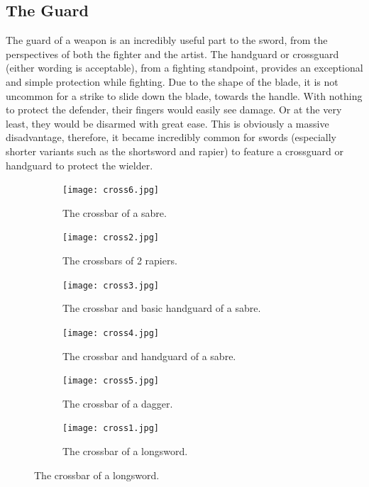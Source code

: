 \documentclass{article}
\begin{document}
\subsection{The Guard}
The guard of a weapon is an incredibly useful part to the sword, from the perspectives of both the fighter and the artist. The handguard or crossguard (either wording is acceptable), from a fighting standpoint, provides an exceptional and simple protection while fighting. Due to the shape of the blade, it is not uncommon for a strike to slide down the blade, towards the handle. With nothing to protect the defender, their fingers would easily see damage. Or at the very least, they would be disarmed with great ease. This is obviously a massive disadvantage, therefore, it became incredibly common for swords (especially shorter variants such as the shortsword and rapier) to feature a crossguard or handguard to protect the wielder.

\begin{figure}[H]
    \centering
    \caption{A collection of crossguards from various blades}
    \label{fig:Crossguards}
    \begin{subfigure}{0.3\textwidth}
        \centering
        \texttt{[image: cross6.jpg]}
        \caption{The crossbar of a sabre.}
        \label{fig:Cross1}
    \end{subfigure}
        \begin{subfigure}{0.3\textwidth}
        \centering
        \texttt{[image: cross2.jpg]}
        \caption{The crossbars of 2 rapiers.}
        \label{fig:Cross2}
    \end{subfigure}
        \begin{subfigure}{0.3\textwidth}
        \centering
        \texttt{[image: cross3.jpg]}
        \caption{The crossbar and basic handguard of a sabre.}
        \label{fig:Cross3}
    \end{subfigure}
        \begin{subfigure}{0.3\textwidth}
        \centering
        \texttt{[image: cross4.jpg]}
        \caption{The crossbar and handguard of a sabre.}
        \label{fig:Cross4}
    \end{subfigure}
        \begin{subfigure}{0.3\textwidth}
        \centering
        \texttt{[image: cross5.jpg]}
        \caption{The crossbar of a dagger.}
        \label{fig:Cross5}
    \end{subfigure}
        \begin{subfigure}{0.3\textwidth}
        \centering
        \texttt{[image: cross1.jpg]}
        \caption{The crossbar of a longsword.}
        \label{fig:Cross6}
    \end{subfigure}
\end{figure}
\end{document}
